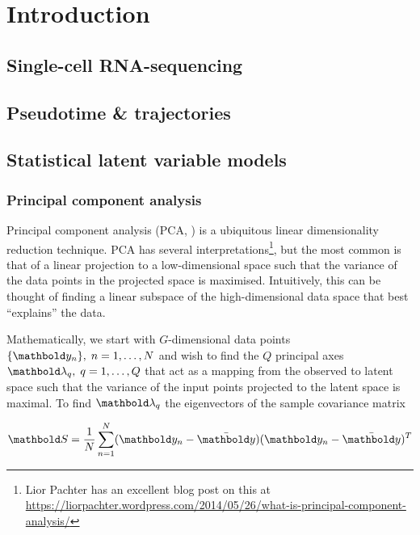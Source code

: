 \chapter{Introduction}\label{ch:introduction}

\section{Single-cell RNA-sequencing}

\section{Pseudotime \& trajectories}

\section{Statistical latent variable models}

\subsection{Principal component analysis}

Principal component analysis (PCA, \cite{jolliffe2002principal}) is a ubiquitous linear dimensionality reduction technique. PCA has several interpretations\footnote{Lior Pachter has an excellent blog post on this at \url{https://liorpachter.wordpress.com/2014/05/26/what-is-principal-component-analysis/}}, but the most common is that of a linear projection to a low-dimensional space such that the variance of the data points in the projected space is maximised. Intuitively, this can be thought of finding a linear subspace of the high-dimensional data space that best ``explains''
the data.

Mathematically, we start with $G$-dimensional data points $\{\mby_n\}, \; n = 1, \ldots, N$ and wish to find the $Q$ principal axes $\mblambda_q, \; q = 1, \ldots, Q$ that act as a mapping from the observed to latent space such that the variance of the input points projected to the latent space is maximal. To find $\mblambda_q$ the eigenvectors of the sample covariance matrix

\begin{equation}
  \mbS = \frac{1}{N}\sum_{n = 1}^N (\mby_n - \bar{\mby}) (\mby_n - \bar{\mby})^T
\end{equation}

